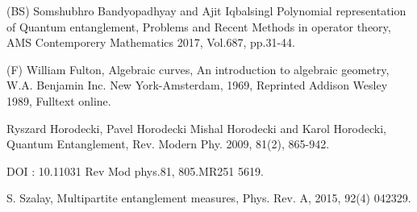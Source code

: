 \documentclass[a4paper,12pt]{article}
\theoremstyle{definition}
\theoremstyle{underlinethm}
\theoremstyle{definition}
\begin{document}
\begin{thebibliography}{99}
\bibitem{} (BS) Somshubhro Bandyopadhyay and Ajit Iqbalsingl Polynomial representation of Quantum entanglement, Problems and Recent Methods in operator theory, AMS Contemporery Mathematics 2017, Vol.687, pp.31-44.

\bibitem{} (F) William Fulton, Algebraic curves, An introduction to algebraic geometry, W.A. Benjamin Inc. New York-Amsterdam, 1969, Reprinted Addison Wesley 1989, Fulltext online. 

\bibitem{} Ryszard Horodecki, Pavel Horodecki Mishal Horodecki and Karol Horodecki, Quantum Entanglement, Rev. Modern Phy. 2009, 81(2), 865-942.

DOI : 10.11031 Rev Mod phys.81, 805.MR251 5619.

\bibitem{} S. Szalay, Multipartite entanglement measures, Phys. Rev. A, 2015, 92(4) 042329.


\end{thebibliography}
\end{document}
